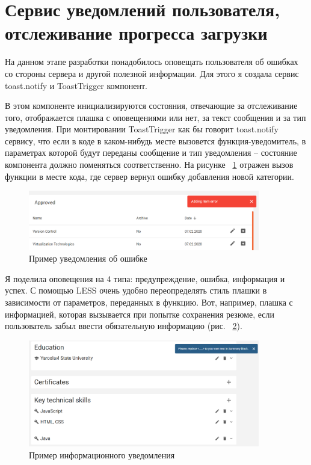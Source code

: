 \documentclass[a4paper,12pt]{diplom}
\begin{document}
\section{Сервис уведомлений пользователя, отслеживание прогресса загрузки}

На данном этапе разработки понадобилось оповещать пользователя об ошибках со стороны сервера и другой полезной информации.
Для этого я создала сервис toast.notify и ToastTrigger компонент.

В этом компоненте инициализируются состояния, отвечающие за отслеживание того, отображается плашка с оповещениями или нет, за текст сообщения и за тип уведомления.
При монтировании ToastTrigger как бы говорит toast.notify сервису, что если в коде в каком-нибудь месте вызовется функция-уведомитель, в параметрах которой будут переданы сообщение и тип уведомления -- состояние
компонента должно поменяться соответственно. На рисунке ~\ref{4} отражен вызов функции в месте кода, где сервер вернул ошибку добавления новой категории.

\begin{figure}[!ht]
\centering
\includegraphics[width=0.9\textwidth]{resources/toasterror.png}
\caption{Пример уведомления об ошибке}
\label{4}
\end{figure}

Я поделила оповещения на 4 типа: предупреждение, ошибка, информация и успех. С помощью
LESS очень удобно переопределять стиль плашки в зависимости от параметров, переданных в
функцию. Вот, например, плашка с информацией, которая вызывается при попытке сохранения резюме, если пользователь
забыл ввести обязательную информацию (рис. ~\ref{5}).

\begin{figure}[!ht]
\centering
\includegraphics[width=0.9\textwidth]{resources/toast.png}
\caption{Пример информационного уведомления}
\label{5}
\end{figure}
\end{document}
